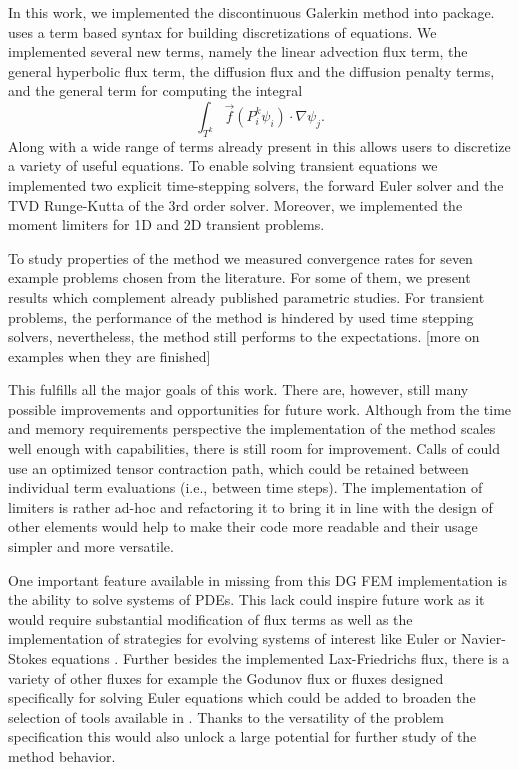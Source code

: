 In this work, we implemented the discontinuous Galerkin method into \sfepy{}
package. \sfepy{} uses a term based syntax for building discretizations of
equations. We implemented several new terms, namely the linear advection flux
term, the general hyperbolic flux term, the diffusion flux and the diffusion
penalty terms, and the general term for computing the integral
$$
\int_{T^k} \vec{f}(P_i^k\psi_i)\cdot\nabla\psi_j.
$$
Along with a wide range of terms already present in \sfepy{} this allows users
to discretize a variety of useful equations. To enable solving transient
equations we implemented two explicit time-stepping solvers, the forward Euler
solver and the TVD Runge-Kutta of the 3rd order solver. Moreover, we
implemented the moment limiters for 1D and 2D transient problems.

To study properties of the method we measured convergence rates for seven
example problems chosen from the literature. For some of them, we present
results which complement already published parametric studies. For transient
problems, the performance of the method is hindered by used time stepping
solvers, nevertheless, the method still performs to the expectations.
[\todo more on examples when they are finished]

This fulfills all the major goals of this work. There are, however, still many
possible improvements and opportunities for future work. Although from the
time and memory requirements perspective the implementation of the method
scales well enough with \sfepy{} capabilities, there is still room for
improvement. Calls of  could use an optimized tensor
contraction path, which could be retained between individual term evaluations
(i.e., between time steps). The implementation of limiters is rather ad-hoc and
refactoring it to bring it in line with the design of other \sfepy{} elements
would help to make their code more readable and their usage simpler and more
versatile. 

One important feature available in \sfepy{} missing from this DG FEM
implementation is the ability to solve systems of PDEs. This lack could inspire
future work as it would require substantial modification of flux terms as well
as the implementation of strategies for evolving systems of interest like Euler
or Navier-Stokes equations \cite{Hesthaven2008}. Further besides the
implemented Lax-Friedrichs flux, there is a variety of other fluxes for example
the Godunov flux \cite{DiPietro2012} or fluxes designed specifically for
solving Euler equations \cite[Section 3.3]{Kucera} which could be added to
broaden the selection of tools available in \sfepy{}. Thanks to the versatility
of the problem specification this would also unlock a large potential for
further study of the method behavior.